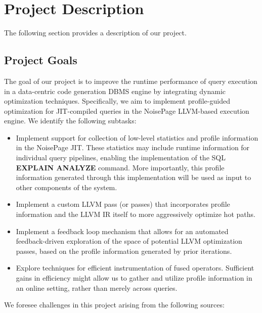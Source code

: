\documentclass{vldb}
\newcommand{\dbCode}[1]{{\sffamily\small \textbf{#1}}\xspace}
\begin{document}
\section{Project Description}

The following section provides a description of our project.

\subsection{Project Goals}

The goal of our project is to improve the runtime performance of query execution in a data-centric code generation DBMS engine by integrating dynamic optimization techniques. Specifically, we aim to implement profile-guided optimization for JIT-compiled queries in the NoisePage \cite{noisepage} LLVM-based execution engine. We identify the following subtasks:

\begin{itemize}
    \item Implement support for collection of low-level statistics and profile information in the NoisePage JIT. These statistics may include runtime information for individual query pipelines, enabling the implementation of the SQL \dbCode{EXPLAIN ANALYZE} command. More importantly, this profile information generated through this implementation will be used as input to other components of the system.
    \item Implement a custom LLVM pass (or passes) that incorporates profile information and the LLVM IR itself to more aggressively optimize hot paths.
    \item Implement a feedback loop mechanism that allows for an automated feedback-driven exploration of the space of potential LLVM optimization passes, based on the profile information generated by prior iterations.
    \item Explore techniques for efficient instrumentation of fused operators. Sufficient gains in efficiency might allow us to gather and utilize profile information in an online setting, rather than merely across queries.
\end{itemize}

We foresee challenges in this project arising from the following sources:
\end{document}

